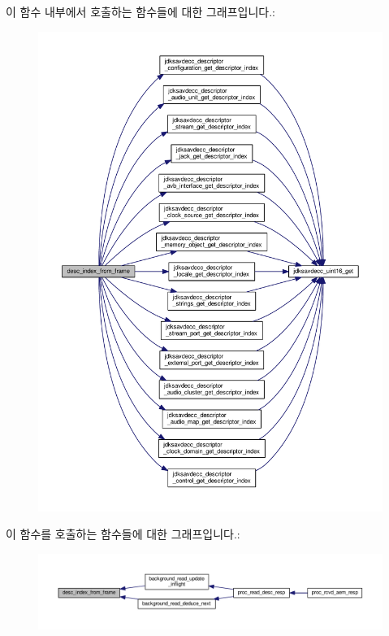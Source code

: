 이 함수 내부에서 호출하는 함수들에 대한 그래프입니다.\+:
\nopagebreak
\begin{figure}[H]
\begin{center}
\leavevmode
\includegraphics[width=350pt]{classavdecc__lib_1_1end__station__imp_aa169d9cd63c3e8d588717a7a6f132fde_cgraph}
\end{center}
\end{figure}




이 함수를 호출하는 함수들에 대한 그래프입니다.\+:
\nopagebreak
\begin{figure}[H]
\begin{center}
\leavevmode
\includegraphics[width=350pt]{classavdecc__lib_1_1end__station__imp_aa169d9cd63c3e8d588717a7a6f132fde_icgraph}
\end{center}
\end{figure}



